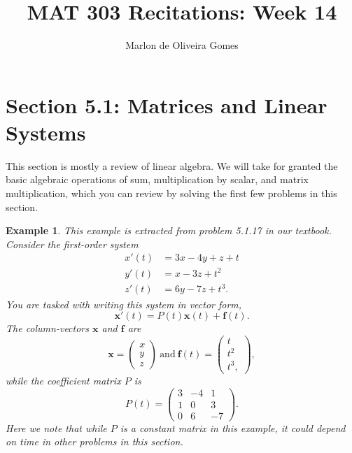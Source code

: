 \documentclass[11pt]{amsart}
\title{MAT 303 Recitations: Week 14}
\author[M. Gomes]{Marlon de Oliveira Gomes}
\newtheorem{example}{Example}
\numberwithin{equation}{section}
\begin{document}
\maketitle


\section*{Section 5.1: Matrices and Linear Systems}

This section is mostly a review of linear algebra. We will take for granted the basic algebraic operations of sum, multiplication by scalar, and matrix multiplication, which you can review by solving the first few problems in this section. 

\begin{example}
This example is extracted from problem 5.1.17 in our textbook. Consider the first-order system
\begin{align*}
x'(t) & = 3x - 4y + z + t \\
y'(t) & = x - 3z  + t^2 \\
z'(t) & = 6y -7z + t^3.
\end{align*}
You are tasked with writing this system in vector form, 
\begin{equation*}
\mathbf{x}'(t)=P(t)\mathbf{x}(t) + \mathbf{f}(t).
\end{equation*}
The column-vectors $\mathbf{x}$ and $\mathbf{f}$ are 
\begin{equation*}
\mathbf{x}=\left(\begin{matrix}
x \\
y \\
z
\end{matrix}
\right) \ \mbox{and} \ \mathbf{f}(t) = \left(
\begin{matrix}
t \\
t^2\\
t^3,
\end{matrix}
\right),
\end{equation*}
while the coefficient matrix $P$ is 
\begin{equation*}
P(t) = 
\left(
	\begin{matrix}
		3 & -4 & 1 \\
		1 & 0 & 3 \\
		0 & 6 & -7
	\end{matrix}
\right).
\end{equation*}
Here we note that while $P$ is a constant matrix in this example, it could depend on time in other problems in this section.
\end{example}
\end{document}
